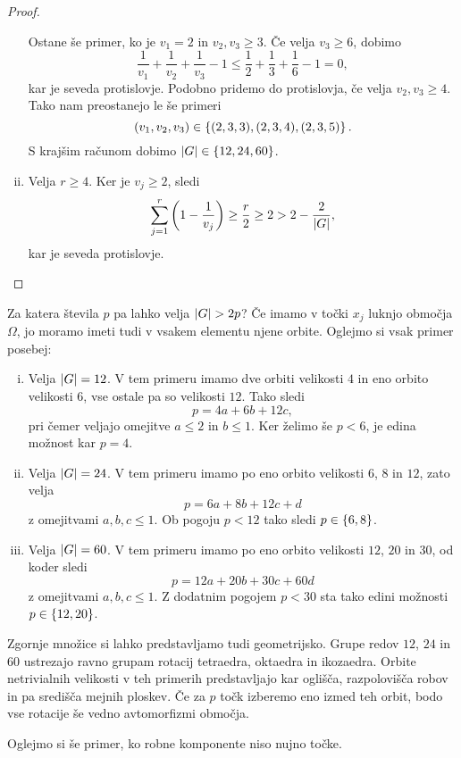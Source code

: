 \begin{proof}
\begin{enumerate}[i)]
Ostane še primer, ko je $v_1 = 2$ in $v_2, v_3 \geq 3$. Če velja
$v_3 \geq 6$, dobimo
\[
\frac{1}{v_1} + \frac{1}{v_2} + \frac{1}{v_3} - 1 \leq
\frac{1}{2} + \frac{1}{3} + \frac{1}{6} - 1 = 0,
\]
kar je seveda protislovje. Podobno pridemo do protislovja, če velja
$v_2, v_3 \geq 4$. Tako nam preostanejo le še primeri
\[
(v_1, v_2, v_3) \in \left\{(2,3,3), (2,3,4), (2,3,5)\right\}.
\]
S krajšim računom dobimo $\left\lvert G\right\rvert \in \left\{12, 24, 60\right\}$.

\item Velja $r \geq 4$. Ker je $v_j \geq 2$, sledi
\[
\sum_{j=1}^r \left(1 - \frac{1}{v_j}\right) \geq
\frac{r}{2} \geq 2 > 2 - \frac{2}{\left\lvert G\right\rvert},
\]
kar je seveda protislovje. \qedhere
\end{enumerate}
\end{proof}

Za katera števila $p$ pa lahko velja $\left\lvert G\right\rvert > 2p$? Če imamo v
točki $x_j$ luknjo območja $\Omega$, jo moramo imeti tudi v vsakem
elementu njene orbite. Oglejmo si vsak primer posebej:

\begin{enumerate}[i)]
\item Velja $\left\lvert G\right\rvert = 12$. V tem primeru imamo dve orbiti
velikosti $4$ in eno orbito velikosti $6$, vse ostale pa so
velikosti $12$. Tako sledi
\[
p = 4a + 6b + 12c,
\]
pri čemer veljajo omejitve $a \leq 2$ in $b \leq 1$. Ker želimo še
$p < 6$, je edina možnost kar $p = 4$.

\item Velja $\left\lvert G\right\rvert = 24$. V tem primeru imamo po eno orbito
velikosti $6$, $8$ in $12$, zato velja
\[
p = 6a + 8b + 12c + d
\]
z omejitvami $a, b, c \leq 1$. Ob pogoju $p < 12$ tako sledi
$p \in \left\{6, 8\right\}$.

\item Velja $\left\lvert G\right\rvert = 60$. V tem primeru imamo po eno orbito
velikosti $12$, $20$ in $30$, od koder sledi
\[
p = 12a + 20b + 30c + 60d
\]
z omejitvami $a, b, c \leq 1$. Z dodatnim pogojem $p < 30$ sta tako
edini možnosti $p \in \left\{12, 20\right\}$.
\end{enumerate}

Zgornje množice si lahko predstavljamo tudi geometrijsko. Grupe
redov $12$, $24$ in $60$ ustrezajo ravno grupam rotacij tetraedra,
oktaedra in ikozaedra. Orbite netrivialnih velikosti v teh primerih
predstavljajo kar oglišča, razpolovišča robov in pa središča mejnih
ploskev. Če za $p$ točk izberemo eno izmed teh orbit, bodo vse
rotacije še vedno avtomorfizmi območja.

Oglejmo si še primer, ko robne komponente niso nujno točke.

